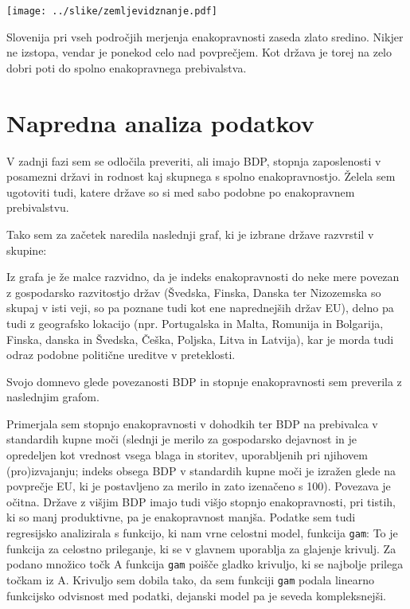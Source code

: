 \documentclass[11pt,a4paper]{article}
\begin{document}
\texttt{[image: ../slike/zemljevidznanje.pdf]}

Slovenija pri vseh področjih merjenja enakopravnosti zaseda zlato sredino. Nikjer ne izstopa, vendar je ponekod celo nad povprečjem. Kot država je torej na zelo dobri poti do spolno enakopravnega prebivalstva.



\section{Napredna analiza podatkov}
V zadnji fazi sem se odločila preveriti, ali imajo BDP, stopnja zaposlenosti v posamezni državi in rodnost kaj skupnega s spolno enakopravnostjo. Želela sem ugotoviti tudi, katere države so si med sabo podobne po enakopravnem prebivalstvu.

Tako sem za začetek naredila naslednji graf, ki je izbrane države razvrstil v skupine:

Iz grafa je že malce razvidno, da je indeks enakopravnosti do neke mere povezan z gospodarsko razvitostjo držav (Švedska, Finska, Danska ter Nizozemska so skupaj v isti veji, so pa poznane tudi kot ene naprednejših držav EU), delno pa tudi z geografsko lokacijo (npr. Portugalska in Malta, Romunija in Bolgarija, Finska, danska in Švedska, Češka, Poljska, Litva in Latvija), kar je morda tudi odraz podobne politične ureditve v preteklosti.

Svojo domnevo glede povezanosti BDP in stopnje enakopravnosti sem preverila z naslednjim grafom. 

Primerjala sem stopnjo enakopravnosti v dohodkih ter BDP na prebivalca v standardih kupne moči (slednji je merilo za gospodarsko dejavnost in je opredeljen kot vrednost vsega blaga in storitev, uporabljenih pri njihovem (pro)izvajanju; indeks obsega BDP v standardih kupne moči je izražen glede na povprečje EU, ki je postavljeno za merilo in zato izenačeno s 100).  
Povezava je očitna. Države z višjim BDP imajo tudi višjo stopnjo enakopravnosti, pri tistih, ki so manj produktivne, pa je enakopravnost manjša. Podatke sem tudi regresijsko analizirala s funkcijo, ki nam vrne celostni model, funkcija \verb-gam-: To je funkcija za celostno prileganje, ki se v glavnem uporablja za glajenje krivulj. Za podano množico točk A funkcija \verb-gam- poišče gladko krivuljo, ki se najbolje prilega točkam iz A. Krivuljo sem dobila tako, da sem funkciji \verb-gam- podala linearno funkcijsko odvisnost med podatki, dejanski model pa je seveda kompleksnejši.
\end{document}
